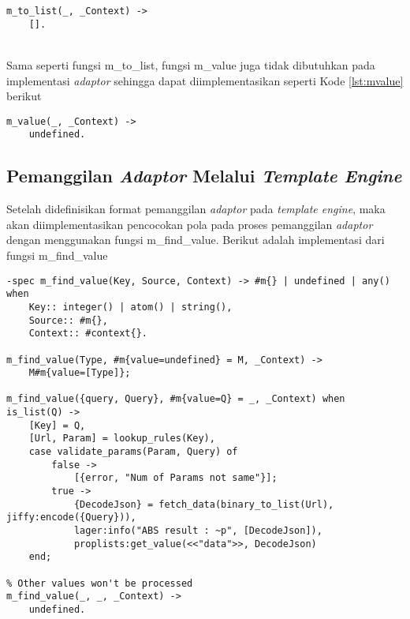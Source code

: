\begin{minipage}{\linewidth}
\begin{lstlisting}[caption={Implementasi fungsi m\_to\_list},label={lst:mtolist}]
m_to_list(_, _Context) ->
	[].
\end{lstlisting}
\end{minipage}\\

Sama seperti fungsi m\_to\_list, fungsi m\_value juga tidak dibutuhkan pada implementasi \textit{adaptor} sehingga dapat diimplementasikan seperti Kode \ref{lst:mvalue} berikut

\begin{minipage}{\linewidth}
\begin{lstlisting}[caption={Implementasi fungsi m\_value},label={lst:mvalue}]
m_value(_, _Context) ->
	undefined.
\end{lstlisting}
\end{minipage}

\subsection{Pemanggilan \textit{Adaptor} Melalui \textit{Template Engine}}

Setelah didefinisikan format pemanggilan \textit{adaptor} pada \textit{template engine}, maka akan diimplementasikan pencocokan pola pada proses pemanggilan \textit{adaptor} dengan menggunakan fungsi m\_find\_value. Berikut adalah implementasi dari fungsi m\_find\_value

\begin{minipage}{\linewidth}
\begin{lstlisting}[caption={Implementasi fungsi m\_find\_value},label={lst:mfindvalue}]
% this method to handle call api from template
-spec m_find_value(Key, Source, Context) -> #m{} | undefined | any() when
	Key:: integer() | atom() | string(),
	Source:: #m{},
	Context:: #context{}.

m_find_value(Type, #m{value=undefined} = M, _Context) ->
	M#m{value=[Type]};

m_find_value({query, Query}, #m{value=Q} = _, _Context) when is_list(Q) ->
	[Key] = Q,
	[Url, Param] = lookup_rules(Key),
	case validate_params(Param, Query) of
		false ->
			[{error, "Num of Params not same"}];
		true ->
			{DecodeJson} = fetch_data(binary_to_list(Url), jiffy:encode({Query})),
			lager:info("ABS result : ~p", [DecodeJson]),
			proplists:get_value(<<"data">>, DecodeJson)
	end;

% Other values won't be processed
m_find_value(_, _, _Context) ->
	undefined. 
\end{lstlisting}
\end{minipage}\\

